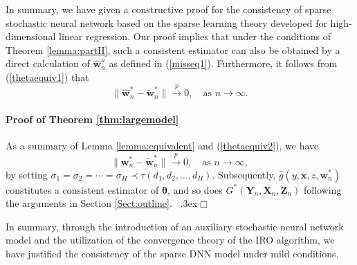 \documentclass[11pt]{article}
\newcommand{\bX}{{\boldsymbol X}}
\newcommand{\bY}{{\boldsymbol Y}}
\newcommand{\bx}{{\boldsymbol x}}
\newcommand{\bZ}{{\boldsymbol Z}}
\newcommand{\bw}{{\boldsymbol w}}
\newcommand{\bU}{{\boldsymbol U}}
\newcommand{\btheta}{{\boldsymbol \theta}}
\newenvironment{proof}{\trivlist\item[\hskip \labelsep{\sc Proof:}]}
 {\unskip\nobreak\ \lower.3ex\hbox{$\Box$}\endtrivlist}
\begin{document}
In summary, we have given a constructive proof for the consistency of sparse 
stochastic neural network based on the sparse learning theory 
developed for high-dimensional linear regression. 
Our proof implies that under the conditions of Theorem \ref{lemma:partII},
such a consistent estimator can also be obtained by a direct 
calculation of $\hat{\bw}_n^u$ as defined in (\ref{misseq1}). 
Furthermore, it follows from (\ref{thetaequiv1}) that 
\begin{equation} \label{thetaequiv2}
\|\hat{\bw}_n^* -\tilde{\bw}_n^*\| \stackrel{p}{\to} 0, \quad \mbox{as $n \to \infty$.}
\end{equation}



\paragraph{Proof of Theorem \ref{thm:largemodel}} 
\begin{proof} As a summary of Lemma \ref{lemma:equivalent} and (\ref{thetaequiv2}),  we have
\[
\|\bw_n^* -\tilde{\bw}_n^*\| \stackrel{p}{\to} 0, \quad \mbox{as $n\to \infty$},
\]
by setting $\sigma_1=\sigma_2=\cdots=\sigma_H \prec \tau(d_1,d_2,\ldots,d_H)$. 
Subsequently, $\hat{g}(y,\bx,z,\bw_{n}^*)$ constitutes a 
consistent estimator of $\btheta$, and so does $G^*(\bY_n,\bX_n,\bZ_n)$ following the arguments 
in Section \ref{Sect:outline}. 
\end{proof}

In summary, through the introduction of an auxiliary stochastic neural network model and the utilization of the convergence theory of the IRO algorithm, 
we have justified the consistency of the sparse DNN model under mild conditions. 
\end{document}
